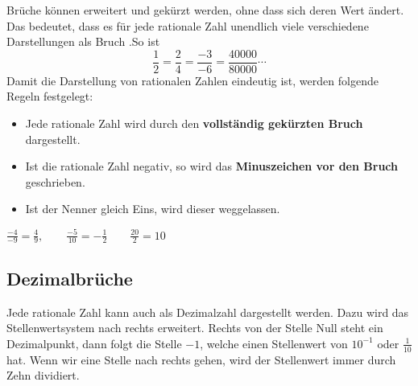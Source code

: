 Brüche können erweitert und gekürzt werden, ohne dass sich deren Wert ändert. Das bedeutet, dass es für jede rationale Zahl unendlich viele verschiedene Darstellungen als Bruch .So ist
\[
  \frac{1}{2} = \frac{2}{4} = \frac{-3}{-6} = \frac{40000}{80000} \cdots
\]
Damit die Darstellung von rationalen Zahlen eindeutig ist, werden folgende Regeln festgelegt:
\begin{itemize}[noitemsep]
  \item Jede rationale Zahl wird durch den \textbf{vollständig gekürzten Bruch} dargestellt.
  \item Ist die rationale Zahl negativ, so wird das \textbf{Minuszeichen vor den Bruch} geschrieben.
  \item Ist der Nenner gleich Eins, wird dieser weggelassen.
\end{itemize}
\begin{example}
  $\displaystyle \frac{-4}{-9} = \frac{4}{9}, \qquad \frac{-5}{10} = -\frac{1}{2} \qquad \frac{20}{2} = 10$
\end{example}

\subsection{Dezimalbrüche}

Jede rationale Zahl kann auch als Dezimalzahl dargestellt werden. Dazu wird das Stellenwertsystem nach rechts erweitert. Rechts von der Stelle Null steht ein Dezimalpunkt, dann folgt die Stelle $-1$, welche einen Stellenwert von $10^{-1}$ oder $\frac{1}{10}$ hat. Wenn wir eine Stelle nach rechts gehen, wird der Stellenwert immer durch Zehn dividiert.

